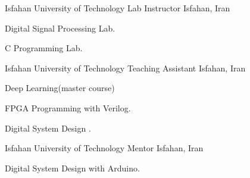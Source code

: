 

\begin{cventries}


  \cventry
    {Isfahan University of Technology} %
    {Lab Instructor} %
    {Isfahan, Iran} %
    { } %
    {
      \begin{cvitems} %
        \item {Digital Signal Processing Lab.}
        \item {C Programming Lab.}
      \end{cvitems}
    }
  \cventry
    {Isfahan University of Technology} %
    {Teaching Assistant} %
    {Isfahan, Iran} %
    { } %
    {
      \begin{cvitems} %
        \item {Deep Learning(master course)}
        \item {FPGA Programming with Verilog.}
        \item {Digital System Design \I.}
      \end{cvitems}
    }
  \cventry
    {Isfahan University of Technology} %
    {Mentor} %
    {Isfahan, Iran} %
    { } %
    {
      \begin{cvitems} %
        \item {Digital System Design with Arduino.}
      \end{cvitems}
    }
    







\end{cventries}
